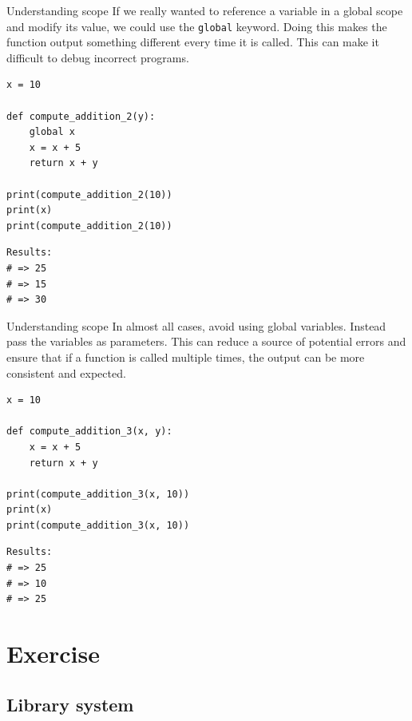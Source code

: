 \documentclass[10pt]{beamer}
\begin{document}
\begin{frame}[label={sec:org97ff279},fragile]{Understanding scope}
 If we really wanted to reference a variable in a global scope and modify its value,
we could use the \texttt{global} keyword. Doing this makes the
function output something different every time it is called. This can make it
difficult to debug incorrect programs.

\begin{verbatim}
x = 10

def compute_addition_2(y):
    global x
    x = x + 5
    return x + y

print(compute_addition_2(10))
print(x)
print(compute_addition_2(10))
\end{verbatim}

\begin{verbatim}
Results: 
# => 25
# => 15
# => 30
\end{verbatim}
\end{frame}

\begin{frame}[label={sec:orgccd4404},fragile]{Understanding scope}
 In almost all cases, avoid using global variables. Instead pass the variables as
parameters. This can reduce a source of potential errors and ensure that if a
function is called multiple times, the output can be more consistent and expected.

\begin{verbatim}
x = 10

def compute_addition_3(x, y):
    x = x + 5
    return x + y

print(compute_addition_3(x, 10))
print(x)
print(compute_addition_3(x, 10))
\end{verbatim}

\begin{verbatim}
Results: 
# => 25
# => 10
# => 25
\end{verbatim}
\end{frame}

\section{Exercise}
\label{sec:org49f72ba}

\subsection{Library system}
\label{sec:orgf149ff4}
\end{document}
